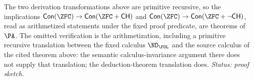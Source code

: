 \begin{remark}
The two derivation transformations above are primitive recursive, so the
implications
\(\mathsf{Con}(\ZFC)\to\mathsf{Con}(\ZFC+\mathsf{CH})\) and
\(\mathsf{Con}(\ZFC)\to\mathsf{Con}(\ZFC+\neg\mathsf{CH})\), read as
arithmetized statements under the fixed proof predicate, are theorems of
\(\PA\).  The omitted verification is the arithmetization, including a
primitive recursive translation between the fixed calculus \(\ND_{\FOL}\)
and the source calculus of the cited theorem above: the semantic
calculus-invariance argument there does not supply that translation; the
deduction-theorem translation does.
\textit{Status: proof sketch.}
\end{remark}

